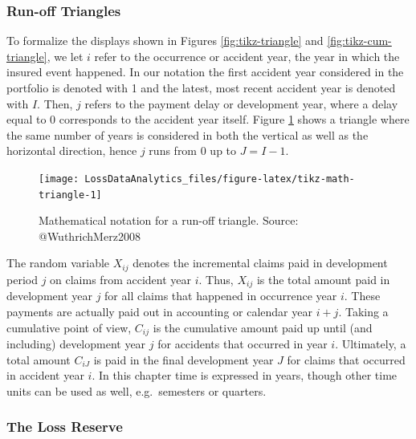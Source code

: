 \documentclass[]{book}
\begin{document}
\subsubsection*{Run-off Triangles}\label{run-off-triangles-1}

To formalize the displays shown in Figures \ref{fig:tikz-triangle} and
\ref{fig:tikz-cum-triangle}, we let \(i\) refer to the occurrence or
accident year, the year in which the insured event happened. In our
notation the first accident year considered in the portfolio is denoted
with 1 and the latest, most recent accident year is denoted with \(I\).
Then, \(j\) refers to the payment delay or development year, where a
delay equal to 0 corresponds to the accident year itself. Figure
\ref{fig:tikz-math-triangle} shows a triangle where the same number of
years is considered in both the vertical as well as the horizontal
direction, hence \(j\) runs from 0 up to \(J = I-1\).

\begin{figure}

{\centering \texttt{[image: LossDataAnalytics\_files/figure-latex/tikz-math-triangle-1]} 

}

\caption{Mathematical notation for a run-off triangle. Source: @WuthrichMerz2008}\label{fig:tikz-math-triangle}
\end{figure}

The random variable \(X_{ij}\) denotes the incremental claims paid in
development period \(j\) on claims from accident year \(i\). Thus,
\(X_{ij}\) is the total amount paid in development year \(j\) for all
claims that happened in occurrence year \(i\). These payments are
actually paid out in accounting or calendar year \(i+j\). Taking a
cumulative point of view, \(C_{ij}\) is the cumulative amount paid up
until (and including) development year \(j\) for accidents that occurred
in year \(i\). Ultimately, a total amount \(C_{iJ}\) is paid in the
final development year \(J\) for claims that occurred in accident year
\(i\). In this chapter time is expressed in years, though other time
units can be used as well, e.g.~semesters or quarters.

\subsubsection*{The Loss Reserve}\label{the-loss-reserve}
\end{document}
